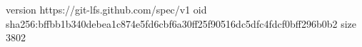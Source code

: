 version https://git-lfs.github.com/spec/v1
oid sha256:bffbb1b340debea1c874e5fd6cbf6a30ff25f90516dc5dfc4fdcf0bff296b0b2
size 3802
